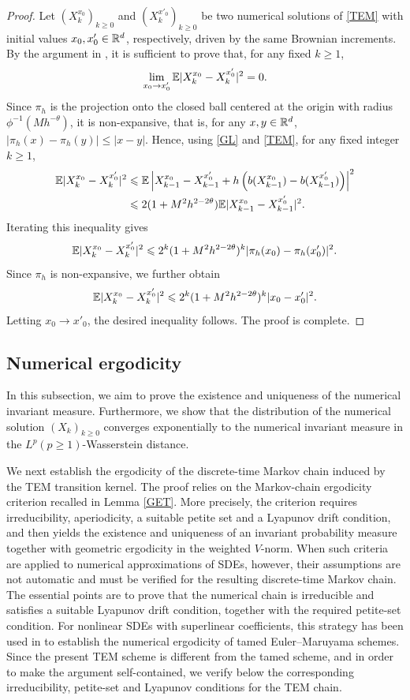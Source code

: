 \documentclass[aap]{imsart}
\theoremstyle{plain}
\theoremstyle{definition}
\begin{document}
\begin{proof}
	Let \((X_k^{x_0})_{k\geqslant0}\) and
	\((X_k^{x'_0})_{k\geqslant0}\) be two numerical solutions of \eqref{TEM}
	with initial values \(x_0,x'_0\in\mathbb{R}^d\), respectively, driven by the same
	Brownian increments. By the argument in \cite[p.142, Lemma 8.1.4]{Ok},
	it is sufficient to prove that, for any fixed \(k\geqslant1\),
	\[
	\lim_{x_0\to x'_0}\mathbb{E}|X_k^{x_0}-X_k^{x'_0}|^2=0.
	\]	
	Since \(\pi_h\) is the projection onto the closed ball centered at the origin
	with radius \(\phi^{-1}(Mh^{-\theta})\), it is non-expansive, that is, for any \(x,y\in\mathbb{R}^d\), \(|\pi_h(x)-\pi_h(y)|\leqslant |x-y|\). 
	Hence,
	using \eqref{GL} and \eqref{TEM}, for any fixed integer \(k\geqslant1\),
	\begin{align*}
		\mathbb{E}|X_k^{x_0}-X_k^{x'_0}|^2
		&\leqslant
		\mathbb{E}\left|
		X_{k-1}^{x_0}-X_{k-1}^{x'_0}
		+h\left(b(X_{k-1}^{x_0})-b(X_{k-1}^{x'_0})\right)
		\right|^2\\
		&\leqslant
		2(1+M^2h^{2-2\theta})
		\mathbb{E}|X_{k-1}^{x_0}-X_{k-1}^{x'_0}|^2.
	\end{align*}
	Iterating this inequality gives
	\[
	\mathbb{E}|X_k^{x_0}-X_k^{x'_0}|^2
	\leqslant
	2^k(1+M^2h^{2-2\theta})^k
	|\pi_h(x_0)-\pi_h(x'_0)|^2.
	\]
	Since \(\pi_h\) is non-expansive, we further obtain
	\[
	\mathbb{E}|X_k^{x_0}-X_k^{x'_0}|^2
	\leqslant
	2^k(1+M^2h^{2-2\theta})^k
	|x_0-x'_0|^2.
	\]
Letting $x_0\rightarrow x'_0$, the desired inequality \label{Fe} follows. The proof is complete.
\end{proof}
	
\subsection{Numerical ergodicity}
In this subsection, we aim to prove the existence and uniqueness of the numerical invariant measure. Furthermore, we show that the distribution of the numerical solution $(X_k)_{k\geqslant 0}$ converges exponentially to the numerical invariant measure in the $L^p(p\geqslant 1)$-Wasserstein distance.

We next establish the ergodicity of the discrete-time Markov chain induced by
the TEM transition kernel. The proof relies on the Markov-chain ergodicity
criterion recalled in Lemma \ref{GET}. More precisely, the criterion requires irreducibility, aperiodicity, a suitable petite set and a Lyapunov drift condition, and then yields the existence and uniqueness of an invariant probability measure together with geometric ergodicity in the weighted \(V\)-norm. When such criteria are applied to numerical approximations of SDEs, however, their assumptions are not automatic and must be verified for the resulting discrete-time Markov chain. The essential points are to prove that the numerical chain is irreducible and satisfies a suitable Lyapunov drift condition, together with the required petite-set
condition. For nonlinear SDEs with superlinear coefficients, this strategy has been used in \cite{LiuWu} to establish the numerical ergodicity of tamed Euler--Maruyama schemes. Since the present TEM scheme is different from the tamed scheme, and in order to make the argument self-contained, we verify below the corresponding irreducibility, petite-set and Lyapunov conditions for the TEM chain.
\end{document}
